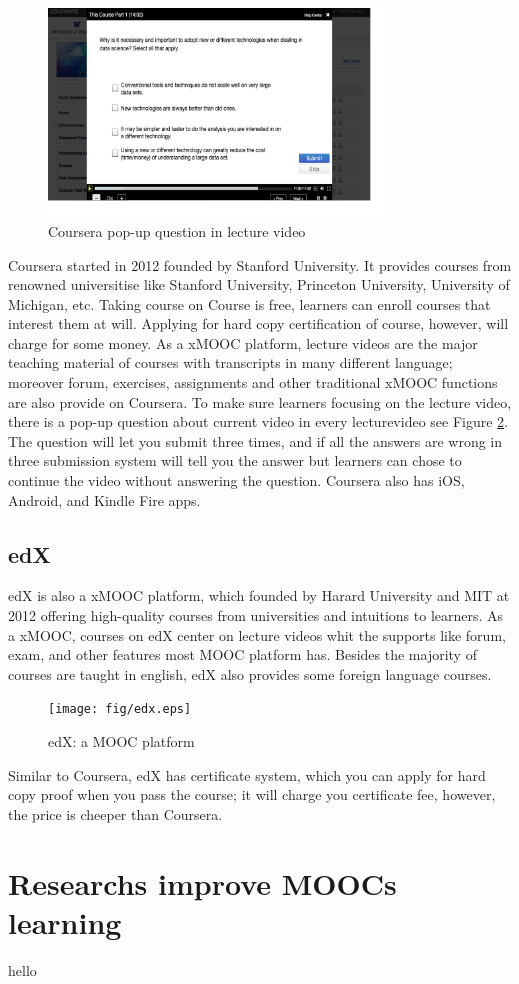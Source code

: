 \begin{figure}[H]
    \centering
    \includegraphics[width = 0.8\textwidth]{fig/coursera_pop.eps}
    \caption{Coursera pop-up question in lecture video}
    \label{fig:coursera_pop}
\end{figure}

Coursera \cite{coursera} started in 2012 founded by Stanford University. It provides courses from renowned universitise like Stanford University,  Princeton University, University of Michigan, etc.
Taking course on Course is free, learners can enroll courses that interest them at will.
Applying for hard copy certification of course, however, will charge for some money.
As a xMOOC platform, lecture videos are the major teaching material of courses with transcripts in many different language; moreover forum, exercises, assignments and other traditional xMOOC functions are also provide on Coursera.
To make sure learners focusing on the lecture video, there is a pop-up question about current video in every lecturevideo see Figure \ref{fig:coursera_pop}.
The question will let you submit three times, and if all the answers are wrong in three submission system will tell you the answer but learners can chose to continue the video without answering the question.
Coursera also has iOS, Android, and Kindle Fire apps.

\subsection{edX}
edX \cite{edx} is also a xMOOC platform, which founded by Harard University and MIT at 2012 offering high-quality courses from universities and intuitions to learners.
As a xMOOC, courses on edX center on lecture videos whit the supports like forum, exam, and other features most MOOC platform has.
Besides the majority of courses are taught in english, edX also provides some foreign language courses.
\begin{figure}[H]
    \centering
    \texttt{[image: fig/edx.eps]}
    \caption{edX: a MOOC platform}
    \label{fig:coursera_pop}
\end{figure}

Similar to Coursera, edX has certificate system, which you can apply for hard copy proof when you pass the course; it will charge you certificate fee, however, the price is cheeper than Coursera.

\section{Researchs improve MOOCs learning}
hello
